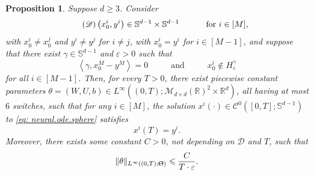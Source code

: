 \documentclass[a4paper,11pt]{article}
\theoremstyle{plain}
\newtheorem{proposition}[theorem]{Proposition}
\newcommand{\R}{\mathbb{R}}
\renewcommand{\S}{\mathbb{S}^{d-1}}
\newcommand{\bW}{\bm{\mathit{W}}}
\newcommand{\bU}{\bm{\mathit{U}}}
\renewcommand{\leq}{\leqslant}
\renewcommand{\geq}{\geqslant}
\numberwithin{equation}{section}
\begin{document}
\begin{proposition} \label{lem: induction.neural.ode}
Suppose $d\geq3$. Consider 
\begin{equation*} \tag{$\mathscr{D}$}
  \left(x_0^i,y^i\right)\in\S\times\S \hspace{1cm} \text{ for } i\in[M], 
\end{equation*}
with $x_0^i\neq x_0^j$ and $y^i\neq y^j$ for $i\neq j$, with $x_0^i=y^i$ for $i\in[M-1]$, and suppose that there exist $\gamma\in\S$ and $\varepsilon>0$ such that
\begin{equation*} 
\left\langle\gamma,x_0^M-y^M\right\rangle=0 \hspace{1cm} \text{ and } \hspace{1cm} 
x_0^i\notin H_{\varepsilon}^{\gamma}
\end{equation*}
for all $i\in[M-1]$. 
Then, for every $T>0$, there exist piecewise constant parameters $\theta=(\bW,\bU,b)\in L^\infty((0,T);\mathscr{M}_{d\times d}(\R)^2\times\R^d)$, all having at most $6$ switches, such that for any $i\in[M]$, the solution $x^i(\cdot)\in \mathscr{C}^0([0,T];\S)$ to \eqref{eq: neural.ode.sphere} satisfies
\begin{equation*}
x^i(T)=y^i.
\end{equation*}
Moreover, there exists some constant $C>0$, not depending on $\mathscr{D}$ and $T$, such that
    \begin{equation*}
        \|\theta\|_{L^\infty((0,T); \Uptheta)}\leq \frac{C}{T\cdot\varepsilon}.
    \end{equation*}
\end{proposition}
\end{document}
